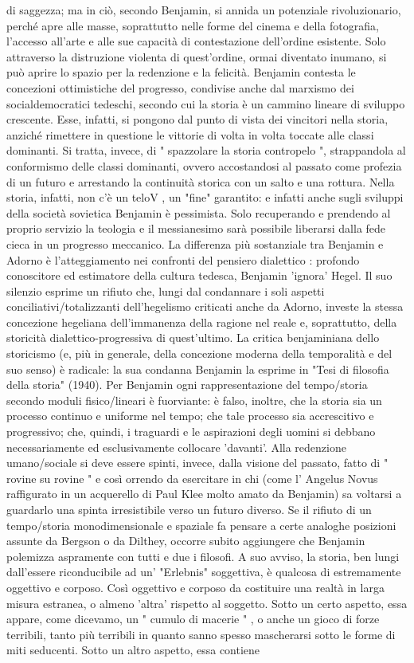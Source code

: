 di saggezza; ma in ciò, secondo Benjamin, si annida un potenziale rivoluzionario, perché apre alle masse, soprattutto nelle forme del cinema e della fotografia, l'accesso all'arte e alle sue capacità di contestazione dell'ordine esistente. Solo attraverso la distruzione violenta di quest'ordine, ormai diventato inumano, si può aprire lo spazio per la redenzione e la felicità. Benjamin contesta le concezioni ottimistiche del progresso, condivise anche dal marxismo dei socialdemocratici tedeschi, secondo cui la storia è un cammino lineare di sviluppo crescente. Esse, infatti, si pongono dal punto di vista dei vincitori nella storia, anziché rimettere in questione le vittorie di volta in volta toccate alle classi dominanti. Si tratta, invece, di " spazzolare la storia contropelo ", strappandola al conformismo delle classi dominanti, ovvero accostandosi al passato come profezia di un futuro e arrestando la continuità storica con un salto e una rottura. Nella storia, infatti, non c'è un teloV , un "fine" garantito: e infatti anche sugli sviluppi della società sovietica Benjamin è pessimista. Solo recuperando e prendendo al proprio servizio la teologia e il messianesimo sarà possibile liberarsi dalla fede cieca in un progresso meccanico. La differenza più sostanziale tra Benjamin e Adorno è l'atteggiamento nei confronti del pensiero dialettico : profondo conoscitore ed estimatore della cultura tedesca, Benjamin 'ignora' Hegel. Il suo silenzio esprime un rifiuto che, lungi dal condannare i soli aspetti conciliativi/totalizzanti dell'hegelismo criticati anche da Adorno, investe la stessa concezione hegeliana dell'immanenza della ragione nel reale e, soprattutto, della storicità dialettico-progressiva di quest'ultimo. La critica benjaminiana dello storicismo (e, più in generale, della concezione moderna della temporalità e del suo senso) è radicale: la sua condanna Benjamin la esprime in "Tesi di filosofia della storia" (1940). Per Benjamin ogni rappresentazione del tempo/storia secondo moduli fisico/lineari è fuorviante: è falso, inoltre, che la storia sia un processo continuo e uniforme nel tempo; che tale processo sia accrescitivo e progressivo; che, quindi, i traguardi e le aspirazioni degli uomini si debbano necessariamente ed esclusivamente collocare 'davanti'. Alla redenzione umano/sociale si deve essere spinti, invece, dalla visione del passato, fatto di " rovine su rovine " e così orrendo da esercitare in chi (come l' Angelus Novus raffigurato in un acquerello di Paul Klee molto amato da Benjamin) sa voltarsi a guardarlo una spinta irresistibile verso un futuro diverso. Se il rifiuto di un tempo/storia monodimensionale e spaziale fa pensare a certe analoghe posizioni assunte da Bergson o da Dilthey, occorre subito aggiungere che Benjamin polemizza aspramente con tutti e due i filosofi. A suo avviso, la storia, ben lungi dall'essere riconducibile ad un' "Erlebnis" soggettiva, è qualcosa di estremamente oggettivo e corposo. Così oggettivo e corposo da costituire una realtà in larga misura estranea, o almeno 'altra' rispetto al soggetto. Sotto un certo aspetto, essa appare, come dicevamo, un " cumulo di macerie " , o anche un gioco di forze terribili, tanto più terribili in quanto sanno spesso mascherarsi sotto le forme di miti seducenti. Sotto un altro aspetto, essa contiene 